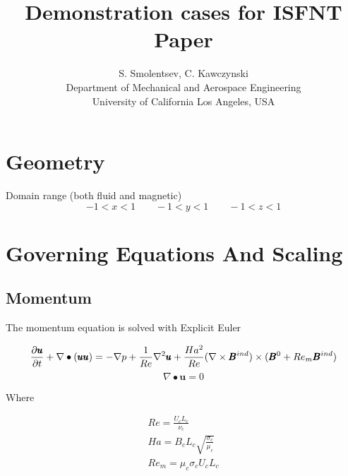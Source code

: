 \documentclass[11pt]{article}
\newcommand{\ffigS}{15.1em}
\newcommand{\ffigH}{\ffigS}
\newcommand{\ffigW}{\ffigS}
\begin{document}
\doublespacing
\title{Demonstration cases for ISFNT Paper}
\author{S. Smolentsev, C. Kawczynski \\
Department of Mechanical and Aerospace Engineering \\
University of California Los Angeles, USA\\
}
\maketitle

\section{Geometry}

Domain range (both fluid and magnetic)
\begin{equation}
	-1 < x < 1 \qquad -1 < y < 1 \qquad -1 < z < 1
\end{equation}

\begin{figure}[H]
 \centering
   \caption[Optional ]{}
\end{figure}

\section{Governing Equations And Scaling}

\subsection{Momentum}
The momentum equation is solved with Explicit Euler

\begin{equation}
	\label{eq:mom}
	\frac{\partial \pmb{u}}{\partial t} + 
	\nabla \bullet (\pmb{u} \pmb{u})
	= 
	- \nabla p
	+ \frac{1}{Re}
	\nabla^2 \pmb{u}
	\\
	+ \frac{Ha^2}{Re}
	(\nabla \times \pmb{B}^{ind}) \times (\pmb{B}^0+Re_m\pmb{B}^{ind})
\end{equation}
\begin{equation}
	\nabla \bullet \pmb{u} = 0
\end{equation}

Where

\noindent
\begin{subequations}
\begin{align}
  Re = \frac{U_c L_c}{\nu_c} \label{eq:Re}
  \\
  Ha = B_c L_c \sqrt{\frac{\sigma_c}{\mu_c}} \label{eq:Ha}
  \\
  Re_m = \mu_c \sigma_c U_c L_c \label{eq:Rem}
\end{align}
\end{subequations}
\end{document}
